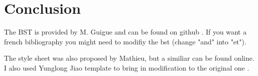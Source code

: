 \chapter{Conclusion}
\label{conclusion}


The BST is provided by M. Guigue and can be found on github \cite{mieuxdumonde}.
If you want a french bibliography you might need to modifiy the bst (change "and" into "et").

The style sheet was also proposed by Mathieu, but a similiar can be found online.
I also used Yunglong Jiao template to bring in modification to the original one \cite{yunglong_thesis}.
